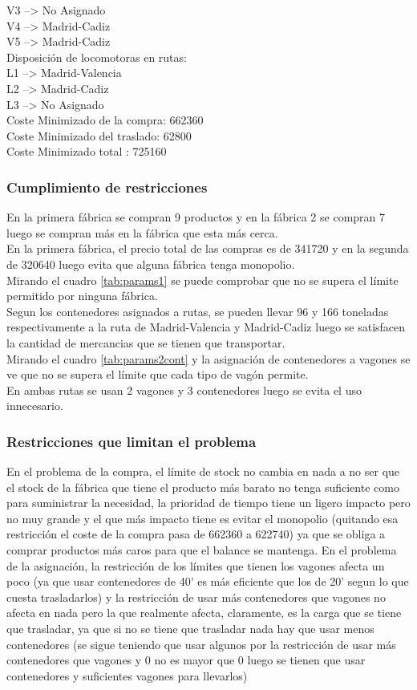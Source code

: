 \documentclass[11pt,spanish]{article}
\begin{document}
\begin{tabbing}
		\>	V3 --> No Asignado\\
		\>	V4 --> Madrid-Cadiz\\
		\>	V5 --> Madrid-Cadiz\\
		Disposición de locomotoras en rutas:\\
		\>	L1 --> Madrid-Valencia\\
		\>	L2 --> Madrid-Cadiz\\
		\>	L3 --> No Asignado\\
		Coste Minimizado de la compra: 662360\\
		Coste Minimizado del traslado: 62800\\
		Coste Minimizado total       : 725160\\
		\end{tabbing}
			\subsubsection{Cumplimiento de restricciones}
			En la primera fábrica se compran 9 productos y en la fábrica 2 se compran 7 luego se compran más en la fábrica que esta más cerca.\\
			En la primera fábrica, el precio total de las compras es de 341720 y en la segunda de 320640 luego evita que alguna fábrica tenga monopolio.\\
			Mirando el cuadro \ref{tab:params1} se puede comprobar que no se supera el límite permitido por ninguna fábrica.\\
			Segun los contenedores asignados a rutas, se pueden llevar 96 y 166 toneladas respectivamente a la ruta de Madrid-Valencia y Madrid-Cadiz luego se satisfacen la cantidad de mercancias que se tienen que transportar.\\
			Mirando el cuadro \ref{tab:params2cont} y la asignación de contenedores a vagones se ve que no se supera el límite que cada tipo de vagón permite.\\
			En ambas rutas se usan 2 vagones y 3 contenedores luego se evita el uso innecesario.
			\subsubsection{Restricciones que limitan el problema}
			En el problema de la compra, el límite de stock no cambia en nada a no ser que el stock de la fábrica que tiene el producto más barato no tenga suficiente como para suministrar la necesidad, la prioridad de tiempo tiene un ligero impacto pero no muy grande y el que más impacto tiene es evitar el monopolio (quitando esa restricción el coste de la compra pasa de 662360 a 622740) ya que se obliga a comprar productos más caros para que el balance se mantenga.
			En el problema de la asignación, la restricción de los límites que tienen los vagones afecta un poco (ya que usar contenedores de 40' es más eficiente que los de 20' segun lo que cuesta trasladarlos) y la restricción de usar más contenedores que vagones no afecta en nada pero la que realmente afecta, claramente, es la carga que se tiene que trasladar, ya que si no se tiene que trasladar nada hay que usar menos contenedores (se sigue teniendo que usar algunos por la restricción de usar más contenedores que vagones y 0 no es mayor que 0 luego se tienen que usar contenedores y suficientes vagones para llevarlos)
\end{document}
